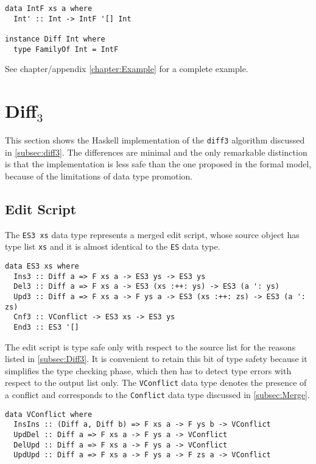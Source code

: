\documentclass[../Thesis.tex]{subfiles}
\begin{document}
\begin{verbatim}
data IntF xs a where
  Int' :: Int -> IntF '[] Int

instance Diff Int where
  type FamilyOf Int = IntF
\end{verbatim}

	See chapter/appendix \ref{chapter:Example} for a complete example.
	
	\section{Diff$_3$}
	This section shows the Haskell implementation of the
	\texttt{diff3} algorithm discussed in \ref{subsec:diff3}.
	The differences are minimal and the only remarkable distinction
	is that the implementation is less safe than the one
	proposed in the formal model, because of the limitations
	of data type promotion.
	

	\subsection{Edit Script}
	\label{subsec:ES3}
	The \texttt{ES3 xs} data type represents a merged edit script,
	whose source object has type list \texttt{xs} and it
	is almost identical to the \texttt{ES} data type.
	
\begin{verbatim}
data ES3 xs where
  Ins3 :: Diff a => F xs a -> ES3 ys -> ES3 ys
  Del3 :: Diff a => F xs a -> ES3 (xs :++: ys) -> ES3 (a ': ys) 
  Upd3 :: Diff a => F xs a -> F ys a -> ES3 (xs :++: zs) -> ES3 (a ': zs) 
  Cnf3 :: VConflict -> ES3 xs -> ES3 ys
  End3 :: ES3 '[] 
\end{verbatim}

	The edit script is type safe only with respect
	to the source list for the reasons listed in \ref{subsec:Diff3}.	
	It is convenient to retain this bit of type safety because it 
	simplifies the type checking phase, which then has to detect type 
	errors with respect to the output list only.
	The \texttt{VConflict} data type denotes the presence
	of a conflict and corresponds to the \texttt{Conflict}
	data type discussed in \ref{subsec:Merge}.
\begin{verbatim}
data VConflict where
  InsIns :: (Diff a, Diff b) => F xs a -> F ys b -> VConflict
  UpdDel :: Diff a => F xs a -> F ys a -> VConflict
  DelUpd :: Diff a => F xs a -> F ys a -> VConflict
  UpdUpd :: Diff a => F xs a -> F ys a -> F zs a -> VConflict
\end{verbatim}
\end{document}
